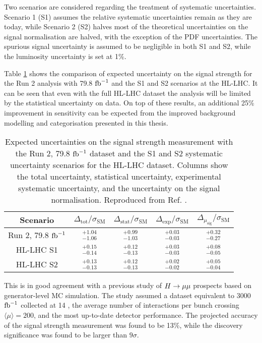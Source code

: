 Two scenarios are considered regarding the treatment of systematic
uncertainties. Scenario 1 (S1) assumes the relative systematic
uncertainties remain as they are today, while Scenario 2 (S2)
halves most of the theoretical uncertainties on the signal normalisation
are halved, with the exception of the PDF uncertainties. The
spurious signal uncertainty is assumed to be negligible in both S1
and S2, while the luminosity uncertainty is set at 1\%.

Table \ref{tab:out:res} shows the comparison of expected uncertainty
on the signal strength for the Run 2 analysis with 79.8 $\text{fb}^{-1}$
and the S1 and S2 scenarios at the HL-LHC. It can be seen that 
even with the full HL-LHC dataset the analysis will be limited
by the statistical uncertainty on data. On top of these results,
an additional 25\% improvement in sensitivity can be expected
from the improved background modelling and categorisation
presented in this thesis.

\begin{table}[htb]
  \renewcommand{\arraystretch}{1.3}
  \centering
  \caption{
    Expected uncertainties on the signal strength measurement with
    the Run 2, 79.8 $\text{fb}^{-1}$ dataset and the S1 and S2 systematic
    uncertainty scenarios for the HL-LHC dataset. Columns show
    the total uncertainty, statistical uncertainty, experimental
    systematic uncertainty, and the uncertainty on the signal
    normalisation.
    Reproduced from Ref. \cite{ATL-PHYS-PUB-2018-054}.}
  \label{tab:out:res}
  \begin{tabular}{ccccc}
    \toprule
    \midrule
    Scenario & $\Delta_\text{tot}/\sigma_\text{SM}$ 
             & $\Delta_\text{stat}/\sigma_\text{SM}$ 
             & $\Delta_\text{exp}/\sigma_\text{SM}$ 
             & $\Delta_{\mu_\text{sig}}/\sigma_\text{SM}$ \\
    \midrule
    Run 2, 79.8 $\text{fb}^{-1}$ & $^{+1.04}_{-1.06}$ & $^{+0.99}_{-1.03}$ & $^{+0.03}_{-0.03}$ & $^{+0.32}_{-0.27}$ \\
    HL-LHC S1          & $^{+0.15}_{-0.14}$ & $^{+0.12}_{-0.13}$ & $^{+0.03}_{-0.03}$ & $^{+0.08}_{-0.05}$ \\
    HL-LHC S2          & $^{+0.13}_{-0.13}$ & $^{+0.12}_{-0.13}$ & $^{+0.02}_{-0.02}$ & $^{+0.05}_{-0.04}$ \\
    \midrule
    \bottomrule
  \end{tabular}
\end{table}

This is in good agreement with a previous study of $H \rightarrow \mu\mu$ prospects
\cite{ATL-PHYS-PUB-2018-006} based on generator-level MC simulation.
The study assumed a dataset equivalent to 3000 $\text{fb}^{-1}$ collected at 14
\TeV, the average number of interactions per bunch crossing
$\langle \mu \rangle = 200$, and the most up-to-date detector performance.
The projected accuracy of the signal strength measurement was found to
be 13\%, while the discovery significance was found to be larger than
$9\sigma$.

